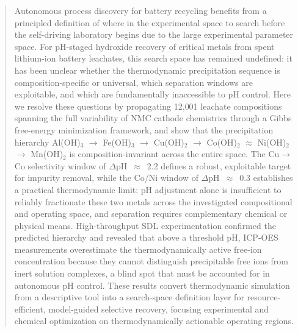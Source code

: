 \documentclass[final,2p,times]{elsarticle}
\begin{document}
\begin{frontmatter}
\begin{abstract}
Autonomous process discovery for battery recycling benefits from a principled definition of where in the experimental space to search before the self-driving laboratory begins due to the large experimental parameter space. For pH-staged hydroxide recovery of critical metals from spent lithium-ion battery leachates, this search space has remained undefined: it has been unclear whether the thermodynamic precipitation sequence is composition-specific or universal, which separation windows are exploitable, and which are fundamentally inaccessible to pH control. Here we resolve these questions by propagating 12{,}001 leachate compositions spanning the full variability of NMC cathode chemistries through a Gibbs free-energy minimization framework, and show that the precipitation hierarchy Al(OH)$_3$ $\to$ Fe(OH)$_3$ $\to$ Cu(OH)$_2$ $\to$ Co(OH)$_2$ $\approx$ Ni(OH)$_2$ $\to$ Mn(OH)$_2$ is composition-invariant across the entire space. The Cu$\to$Co selectivity window of $\Delta$pH~$\approx$~2.2 defines a robust, exploitable target for impurity removal, while the Co/Ni window of $\Delta$pH~$\approx$~0.3 establishes a practical thermodynamic limit: pH adjustment alone is insufficient to reliably fractionate these two metals across the investigated compositional and operating space, and separation requires complementary chemical or physical means. High-throughput SDL experimentation confirmed the predicted hierarchy and revealed that above a threshold pH, ICP-OES measurements overestimate the thermodynamically active free-ion concentration because they cannot distinguish precipitable free ions from inert solution complexes, a blind spot that must be accounted for in autonomous pH control. These results convert thermodynamic simulation from a descriptive tool into a search-space definition layer for resource-efficient, model-guided selective recovery, focusing experimental and chemical optimization on thermodynamically actionable operating regions.
\end{abstract}


\begin{graphicalabstract}
\end{graphicalabstract}


\end{frontmatter}
\end{document}
